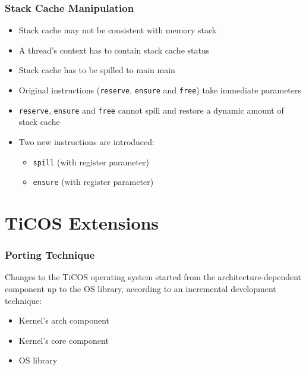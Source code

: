 \documentclass[notheorems]{beamer}
\begin{document}
\begin{frame}
\frametitle{Stack Cache Manipulation}
\begin{itemize}
	\item Stack cache may not be consistent with memory stack
	\item A thread's context has to contain stack cache status
	\item Stack cache has to be spilled to main main 
	\item Original instructions (\texttt{reserve}, \texttt{ensure} and \texttt{free}) take immediate parameters
	\item \texttt{reserve}, \texttt{ensure} and \texttt{free} cannot spill and restore a dynamic amount of stack cache
	\item Two new instructions are introduced:
		\begin{itemize}
			\item \texttt{spill} (with register parameter)
			\item \texttt{ensure} (with register parameter)
		\end{itemize}
\end{itemize}
\end{frame}

\section{TiCOS Extensions}
\begin{frame}
\frametitle{Porting Technique}
Changes to the TiCOS operating system started from the architecture-dependent component up to the OS library, according to an incremental development technique:
\begin{itemize}
	\item Kernel's arch component
	\item Kernel's core component
	\item OS library
\end{itemize}
\end{frame}
\end{document}
